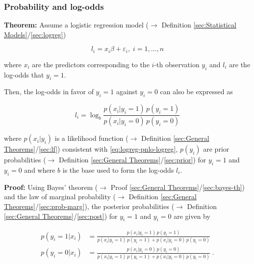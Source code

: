 \documentclass[a4paper,12pt,twoside]{book}
\begin{document}
\subsubsection[\textbf{Probability and log-odds}]{Probability and log-odds} \label{sec:logreg-pnlo}
\setcounter{equation}{0}

\textbf{Theorem:} Assume a logistic regression model ($\rightarrow$ Definition \ref{sec:Statistical Models}/\ref{sec:logreg})

\begin{equation} \label{eq:logreg-pnlo-logreg}
l_i = x_i \beta + \varepsilon_i, \; i = 1,\ldots,n
\end{equation}

where $x_i$ are the predictors corresponding to the $i$-th observation $y_i$ and $l_i$ are the log-odds that $y_i = 1$.

Then, the log-odds in favor of $y_i = 1$ against $y_i = 0$ can also be expressed as

\begin{equation} \label{eq:logreg-pnlo-lodds}
l_i = \log_b \frac{p(x_i|y_i=1) \, p(y_i=1)}{p(x_i|y_i=0) \, p(y_i=0)}
\end{equation}

where $p(x_i \vert y_i)$ is a likelihood function ($\rightarrow$ Definition \ref{sec:General Theorems}/\ref{sec:lf}) consistent with \eqref{eq:logreg-pnlo-logreg}, $p(y_i)$ are prior probabilities ($\rightarrow$ Definition \ref{sec:General Theorems}/\ref{sec:prior}) for $y_i = 1$ and $y_i = 0$ and where $b$ is the base used to form the log-odds $l_i$.


\vspace{1em}
\textbf{Proof:} Using Bayes' theorem ($\rightarrow$ Proof \ref{sec:General Theorems}/\ref{sec:bayes-th}) and the law of marginal probability ($\rightarrow$ Definition \ref{sec:General Theorems}/\ref{sec:prob-marg}), the posterior probabilities ($\rightarrow$ Definition \ref{sec:General Theorems}/\ref{sec:post}) for $y_i = 1$ and $y_i = 0$ are given by

\begin{equation} \label{eq:logreg-pnlo-prob}
\begin{split}
p(y_i=1|x_i) &= \frac{p(x_i|y_i=1) \, p(y_i=1)}{p(x_i|y_i=1) \, p(y_i=1) + p(x_i|y_i=0) \, p(y_i=0)} \\
p(y_i=0|x_i) &= \frac{p(x_i|y_i=0) \, p(y_i=0)}{p(x_i|y_i=1) \, p(y_i=1) + p(x_i|y_i=0) \, p(y_i=0)} \; .
\end{split}
\end{equation}
\end{document}
